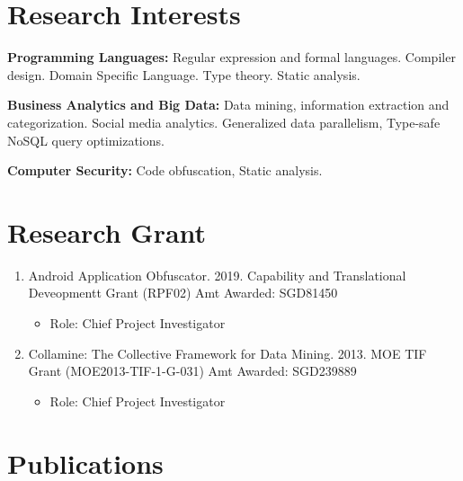 \documentclass[margin,line]{res}
\newcommand{\researchonly}[1]{#1}
\begin{document}
\begin{resume}
\researchonly{
\section{\sc Research Interests}
{\bf Programming Languages:} Regular expression and formal
languages. Compiler design. Domain Specific Language. Type
theory. Static analysis.

{\bf Business Analytics and Big Data:} Data mining, information extraction and categorization. Social media analytics.
Generalized data parallelism, Type-safe NoSQL query optimizations.

{\bf Computer Security:} Code obfuscation, Static analysis.

\section{\sc Research Grant}
\begin{enumerate}
\item Android Application Obfuscator. 2019. Capability and Translational Deveopmentt
Grant (RPF02) Amt Awarded: SGD81450
    \begin{itemize}
       \item Role: Chief Project Investigator
       \end{itemize}
\item Collamine: The Collective Framework for Data Mining. 2013. MOE TIF
Grant (MOE2013-TIF-1-G-031) Amt Awarded: SGD239889
    \begin{itemize}
       \item Role: Chief Project Investigator
    \end{itemize}
       
\end{enumerate}
    



\section{\sc Publications}

}
\end{resume}
\end{document}
